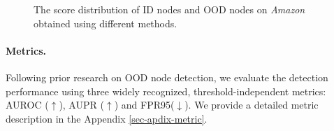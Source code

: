 \begin{figure*}[!t]
    \caption{The score distribution of ID nodes and OOD nodes on \textit{Amazon}  obtained using different methods.}
    \label{F-Frequency}
    \vskip -0.1in
\end{figure*}







\paragraph{Metrics.}
Following prior research on OOD node detection, we evaluate the detection performance using three widely recognized, threshold-independent metrics: AUROC ($\uparrow$), AUPR ($\uparrow$) and FPR95($\downarrow$). We provide a detailed metric description in the Appendix \ref{sec-apdix-metric}.

